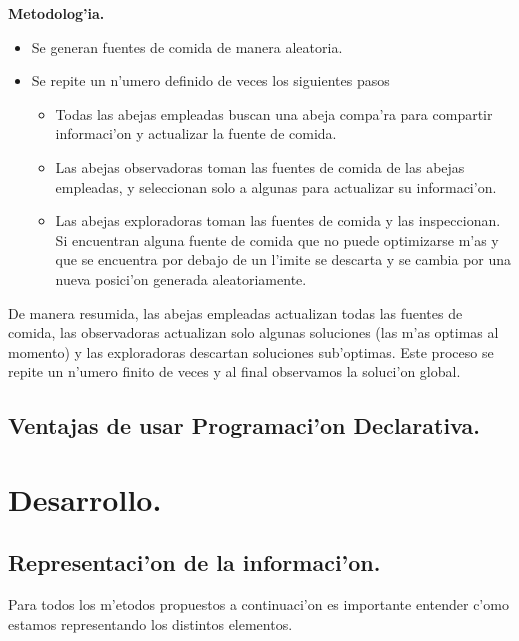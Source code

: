 \documentclass[12pt]{article}
\begin{document}
    \textbf{Metodolog'ia.}
    \begin{itemize}
        \item Se generan fuentes de comida de manera aleatoria.
        \item Se repite un n'umero definido de veces los siguientes pasos
            \begin{itemize}
                \setlength\itemsep{0em}
                \item Todas las abejas empleadas buscan una abeja compa'ra para compartir informaci'on y actualizar
                    la fuente de comida.
                \item Las abejas observadoras toman las fuentes de comida de las abejas empleadas, y seleccionan
                    solo a algunas para actualizar su informaci'on.
                \item Las abejas exploradoras toman las fuentes de comida y las inspeccionan. Si encuentran
                alguna fuente de comida que no puede optimizarse m'as y que se encuentra por debajo de un l'imite
                se descarta y se cambia por una nueva posici'on generada aleatoriamente.

            \end{itemize}

    \end{itemize}

    De manera resumida, las abejas empleadas actualizan todas las fuentes de comida, las observadoras
    actualizan solo algunas soluciones (las m'as optimas al momento) y las exploradoras descartan soluciones
    sub'optimas. Este proceso se repite un n'umero finito de veces y al final observamos
    la soluci'on global.

    \subsection{Ventajas de usar Programaci'on Declarativa.}




    \section{Desarrollo.}

    \subsection{Representaci'on de la informaci'on.}
    Para todos los m'etodos propuestos a continuaci'on es importante
    entender c'omo estamos representando los distintos
    elementos.
\end{document}
